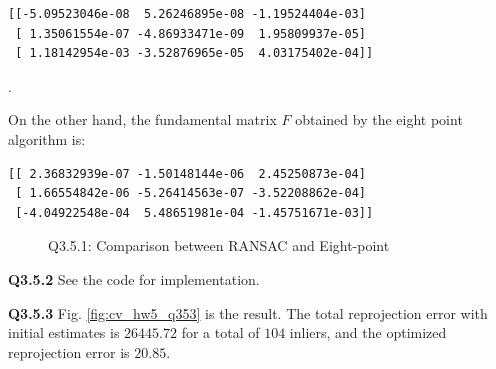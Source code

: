 \documentclass[
  course = {{16-720B Computer Vision}},
  quartile = {{1}},
  assignment = 5\ -\ 3D\ Reconstruction\ \&\ Photometric\ Stereo,
  name = {{Kangle Deng}},
  email = {{kangled@andrew.cmu.edu}},
  firstexercise = 1
]{aga-homework}
\begin{document}
\begin{verbatim}
[[-5.09523046e-08  5.26246895e-08 -1.19524404e-03]
 [ 1.35061554e-07 -4.86933471e-09  1.95809937e-05]
 [ 1.18142954e-03 -3.52876965e-05  4.03175402e-04]]
\end{verbatim}.

On the other hand, the fundamental matrix $F$ obtained by the eight point algorithm is:

\begin{verbatim}
[[ 2.36832939e-07 -1.50148144e-06  2.45250873e-04]
 [ 1.66554842e-06 -5.26414563e-07 -3.52208862e-04]
 [-4.04922548e-04  5.48651981e-04 -1.45751671e-03]]
\end{verbatim}

\begin{figure}
    \centering
    \caption{Q3.5.1: Comparison between RANSAC and Eight-point}
    \label{fig:cv_hw5_q351}
\end{figure}

\noindent\textbf{Q3.5.2} See the code for implementation.

\noindent\textbf{Q3.5.3} Fig. \ref{fig:cv_hw5_q353} is the result. The total reprojection error with initial estimates is $26445.72$ for a total of $104$ inliers, and the optimized reprojection error is $20.85$.
\end{document}
